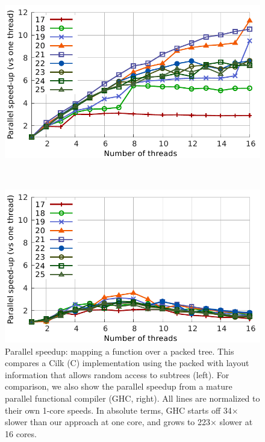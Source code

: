 \documentclass[a4paper,english]{lipics-v2016}
\begin{document}
\begin{figure}[t]
    \centering
  \begin{minipage}{.75\textwidth}
    \centering
    \includegraphics[width=\textwidth]{./figs/speedup_cilk.pdf}
  \end{minipage}
  $ $ 
  \begin{minipage}{.75\textwidth} 
    \centering
    \includegraphics[width=\textwidth]{./figs/speedup_ghc.pdf}
  \end{minipage}
   \caption{Parallel speedup: mapping a function over a packed tree.  This
     compares a Cilk (C) implementation using the packed with layout information
     that allows random access to subtrees (left).  For comparison, we also show
     the parallel speedup from a mature parallel functional compiler (GHC,
     right).  All lines are normalized to their own 1-core speeds.  In absolute
     terms, GHC starts off 34$\times$ slower than our approach at one core, and
     grows to 223$\times$ slower at 16 cores.}
   \label{fig:par-shootout}
\end{figure}
\end{document}
